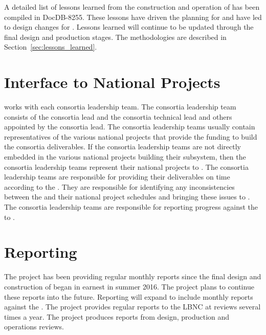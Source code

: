 A detailed list of lessons learned from the construction and operation
of  has been compiled in DocDB-8255. These lessons have
driven the planning for  and have led to design changes for
. Lessons learned will continue to be updated through the final
design and production stages. The methodologies are described in
Section~\ref{sec:lessons_learned}.

\section{Interface to National Projects}
\label{sec:fdsp-coord-national}

  works with each consortia leadership team. The
consortia leadership team consists of the consortia lead and the
consortia technical lead and others appointed by the consortia
lead. The consortia leadership teams usually contain representatives
of the various national projects that provide the funding to build the consortia
deliverables. If the consortia leadership teams are not directly
embedded in the various national projects building their subsystem,
then the consortia leadership teams represent their national projects
to . The consortia leadership teams are responsible for
providing their deliverables on time according to the
. They are responsible for identifying any inconsistencies
between the  and their national project schedules and
bringing these issues to . The consortia leadership teams
are responsible for reporting progress against the  to
.

\section{Reporting}
\label{sec:fdsp-coord-reporting}

The  project has been providing regular monthly reports
since the final design and construction of  began in
earnest in summer 2016. The project plans to continue these reports
into the future. Reporting will expand to include monthly reports
against the . The  project provides regular
reports to the LBNC at reviews several times a year. The  project
produces reports from design, production and operations reviews.



